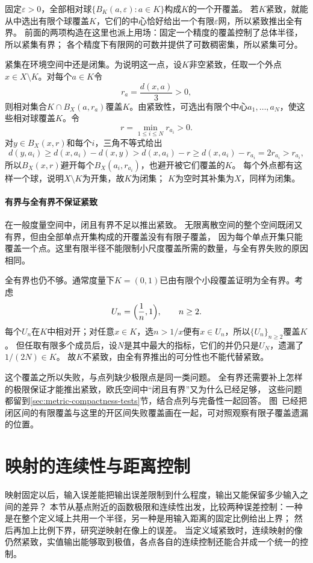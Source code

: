 固定$\varepsilon>0$，全部相对球$\{B_K(a,\varepsilon):a\in K\}$构成$K$的一个开覆盖。
若$K$紧致，就能从中选出有限个球覆盖$K$，它们的中心恰好给出一个有限$\varepsilon$网，所以紧致推出全有界。
前面的两项构造在这里也派上用场：固定一个精度的覆盖控制了总体半径，所以紧集有界；
各个精度下有限网的可数并提供了可数稠密集，所以紧集可分。

紧集在环境空间中还是闭集。为说明这一点，设$K$非空紧致，任取一个外点$x\in X\setminus K$。对每个$a\in K$令
\[
  r_a=\frac{d(x,a)}{3}>0,
\]
则相对集合$K\cap B_X(a,r_a)$覆盖$K$。由紧致性，可选出有限个中心$a_1,\ldots,a_N$，使这些相对球覆盖$K$。令
\[
  r=\min_{1\leq i\leq N}r_{a_i}>0.
\]
对$y\in B_X(x,r)$和每个$i$，三角不等式给出
\[
  d(y,a_i)\geq d(x,a_i)-d(x,y)>d(x,a_i)-r\geq d(x,a_i)-r_{a_i}=2r_{a_i}>r_{a_i},
\]
所以$B_X(x,r)$避开每个$B_X(a_i,r_{a_i})$，也避开被它们覆盖的$K$。
每个外点都有这样一个球，说明$X\setminus K$为开集，故$K$为闭集；
$K$为空时其补集为$X$，同样为闭集。

\paragraph{有界与全有界不保证紧致}

在一般度量空间中，闭且有界不足以推出紧致。
无限离散空间的整个空间既闭又有界，但由全部单点开集构成的开覆盖没有有限子覆盖，
因为每个单点开集只能覆盖一个点。这里有限半径不能限制小尺度覆盖所需的数量，与全有界失败的原因相同。

全有界也仍不够。通常度量下$K=(0,1)$已由有限个小段覆盖证明为全有界。考虑
\[
  U_n=\Bigl(\frac1n,1\Bigr),\qquad n\geq2.
\]
每个$U_n$在$K$中相对开；对任意$x\in K$，选$n>1/x$便有$x\in U_n$，所以$\{U_n\}_{n\geq2}$覆盖$K$。
但任取有限多个成员后，设$N$是其中最大的指标，它们的并仍只是$U_N$，遗漏了$1/(2N)\in K$。
故$K$不紧致，由全有界推出的可分性也不能代替紧致。

这个覆盖之所以失败，与点列缺少极限点是同一类问题。
全有界还需要补上怎样的极限保证才能推出紧致，欧氏空间中“闭且有界”又为什么已经足够，
这些问题都留到\ref{sec:metric-compactness-tests}节，结合点列与完备性一起回答。
图~已经把闭区间的有限覆盖与这里的开区间失败覆盖画在一起，可对照观察有限子覆盖遗漏的位置。

\section{映射的连续性与距离控制}
\label{sec:metric-map-error-transfer}

映射固定以后，输入误差能把输出误差限制到什么程度，输出又能保留多少输入之间的差异？
本节从基点附近的函数极限和连续性出发，比较两种误差控制：一种是在整个定义域上共用一个半径，另一种是用输入距离的固定比例给出上界；
然后再加上比例下界，研究逆映射在像上的误差。
当定义域紧致时，连续映射的像仍然紧致，实值输出能够取到极值，各点各自的连续控制还能合并成一个统一的控制。

